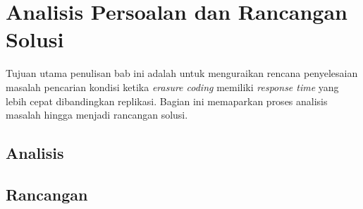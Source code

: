 \chapter{Analisis Persoalan dan Rancangan Solusi}

Tujuan utama penulisan bab ini adalah untuk menguraikan rencana penyelesaian masalah pencarian kondisi ketika \textit{erasure coding} memiliki \textit{response time} yang lebih cepat dibandingkan replikasi. Bagian ini memaparkan proses analisis masalah hingga menjadi rancangan solusi.


\section{Analisis}







\section{Rancangan}



